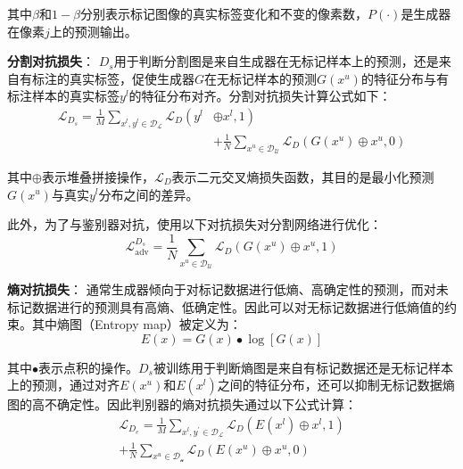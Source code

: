\documentclass[lang=chs, degree=master, blindreview=false, adobe=false]{yanputhesis}
\begin{document}
其中$\beta$和$1 - \beta$分别表示标记图像的真实标签变化和不变的像素数，$P\left(\cdot\right)$是生成器在像素$j$上的预测输出。

\textbf{分割对抗损失}：
$D_s$用于判断分割图是来自生成器在无标记样本上的预测，还是来自有标注的真实标签，促使生成器$G$在无标记样本的预测$G(x^u)$的特征分布与有标注样本的真实标签$y^l$的特征分布对齐。分割对抗损失计算公式如下：
\begin{equation}
  \label{eq:SemiCDNetLossDs}
  \begin{aligned}
    \mathcal{L}_{D_{s}}=\frac{1}{M} \sum_{x^{l}, y^{l} \in \mathcal{D}_{\mathcal{L}}} \mathcal{L}_{D}\left(y^{l}\right. & \left.\oplus x^{l}, 1\right) \\
    & +\frac{1}{N} \sum_{x^{u} \in \mathcal{D}_{\mathcal{U}}} \mathcal{L}_{D}\left(G\left(x^{u}\right) \oplus x^{u}, 0\right)
    \end{aligned}
\end{equation}

其中$\oplus$表示堆叠拼接操作，$\mathcal{L}_{D}$表示二元交叉熵损失函数，其目的是最小化预测$G(x^u)$与真实$y^l$分布之间的差异。

此外，为了与鉴别器对抗，使用以下对抗损失对分割网络进行优化：
\begin{equation}
  \label{eq:SemiCDNetLossDsadv}
  \mathcal{L}_{\mathrm{adv}}^{D_{s}}=\frac{1}{N} \sum_{x^{u} \in \mathcal{D}_{\mathcal{U}}} \mathcal{L}_{D}\left(G\left(x^{u}\right) \oplus x^{u}, 1\right)
\end{equation}

\textbf{熵对抗损失}：
通常生成器倾向于对标记数据进行低熵、高确定性的预测，而对未标记数据进行的预测具有高熵、低确定性。因此可以对无标记数据进行低熵值的约束。其中熵图（Entropy map）被定义为：
\begin{equation}
  \label{eq:SemiCDNetEntropy}
  E(x)=G(x) \bullet \log [G(x)]
\end{equation}

其中$\bullet$表示点积的操作。$D_s$被训练用于判断熵图是来自有标记数据还是无标记样本上的预测，通过对齐$E(x^u)$和$E(x^l)$之间的特征分布，还可以抑制无标记数据熵图的高不确定性。因此判别器的熵对抗损失通过以下公式计算：
\begin{equation}
  \label{eq:SemiCDNetLossDe}
  \begin{array}{l}
    \mathcal{L}_{D_{e}}=\frac{1}{M} \sum_{x^{l}, y^{\prime} \in \mathcal{D}_{\mathcal{L}}} \mathcal{L}_{D}\left(E\left(x^{l}\right) \oplus x^{l}, 1\right) \\
    +\frac{1}{N} \sum_{x^{u} \in \mathcal{D}_{\mathcal{u}}} \mathcal{L}_{D}\left(E\left(x^{u}\right) \oplus x^{u}, 0\right)
    \end{array}
\end{equation}
\end{document}
